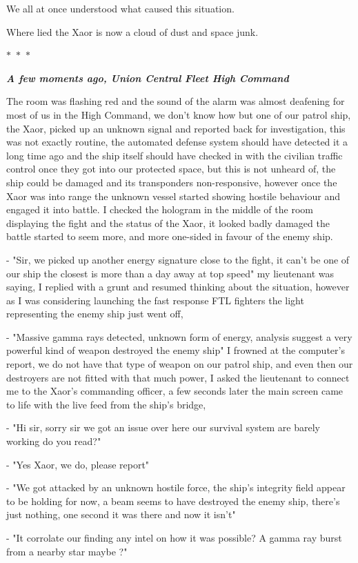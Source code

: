 \documentclass[colorlinks,12pt,a4paper]{book}
\newcommand\sep{\begin{center}
  \boldmath $\ast$~$\ast$~$\ast$
\end{center}}
\begin{document}
We all at once understood what caused this situation.\newline\par
Where lied the Xaor is now a cloud of dust and space junk.

\sep

\textit{\textbf{A few moments ago, Union Central Fleet High Command}}\par 
\bigskip 

The room was flashing red and the sound of the alarm was almost deafening for most of us in the High Command, we don't know how 
but one of our patrol ship, the Xaor, picked up an unknown signal and reported back for investigation, this was not exactly 
routine, the automated defense system should have detected it a long time ago and the ship itself should have checked in
with the civilian traffic control once they got into our protected space, but this is not unheard of, the ship could be 
damaged and its transponders non-responsive, however once the Xaor was into range the unknown vessel started showing hostile 
behaviour and engaged it into battle. I checked the hologram in the middle of the room displaying the fight and the status 
of the Xaor, it looked badly damaged the battle started to seem more, and more one-sided in favour of the enemy ship.\par
\bigskip

- "Sir, we picked up another energy signature close to the fight, it can't be one of our ship the closest is more than a day away 
at top speed" my lieutenant was saying, I replied with a grunt and resumed thinking about the situation, however as I was considering 
launching the fast response FTL fighters the light representing the enemy ship just went off,\newline\par 
- "Massive gamma rays detected, unknown form of energy, analysis suggest a very powerful kind of weapon destroyed the enemy ship" 
I frowned at the computer's report, we do not have that type of weapon on our patrol ship, and even then our destroyers are not 
fitted with that much power, I asked the lieutenant to connect me to the Xaor's commanding officer, a few seconds later the main
screen came to life with the live feed from the ship's bridge,\newline\par

- "Hi sir, sorry sir we got an issue over here our survival system are barely working do you read?"\par
- "Yes Xaor, we do, please report"\par
- "We got attacked by an unknown hostile force, the ship's integrity field appear to be holding for now, a beam seems 
to have destroyed the enemy ship, there's just nothing, one second it was there and now it isn't"\par
- "It corrolate our finding any intel on how it was possible? A gamma ray burst from a nearby star maybe ?"\par 
\bigskip 
\end{document}
